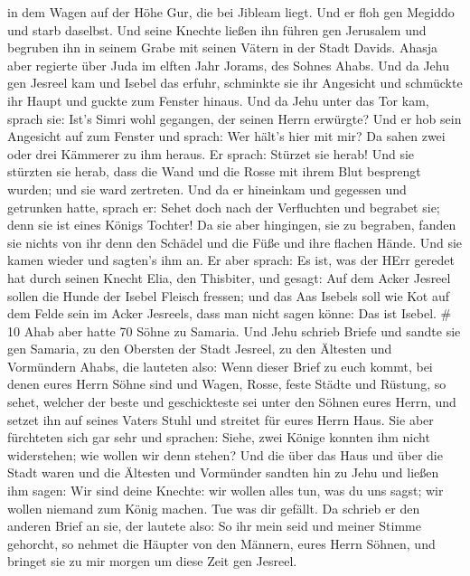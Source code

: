 in dem Wagen auf der Höhe Gur, die bei Jibleam liegt. Und er floh gen
Megiddo und starb daselbst.  Und seine Knechte ließen ihn
führen gen Jerusalem und begruben ihn in seinem Grabe mit seinen Vätern
in der Stadt Davids.  Ahasja aber regierte über Juda im
elften Jahr Jorams, des Sohnes Ahabs.  Und da Jehu gen
Jesreel kam und Isebel das erfuhr, schminkte sie ihr Angesicht und
schmückte ihr Haupt und guckte zum Fenster hinaus.  Und da
Jehu unter das Tor kam, sprach sie: Ist's Simri wohl gegangen, der
seinen Herrn erwürgte?  Und er hob sein Angesicht auf zum
Fenster und sprach: Wer hält's hier mit mir? Da sahen zwei oder drei
Kämmerer zu ihm heraus.  Er sprach: Stürzet sie herab! Und
sie stürzten sie herab, dass die Wand und die Rosse mit ihrem Blut
besprengt wurden; und sie ward zertreten.  Und da er
hineinkam und gegessen und getrunken hatte, sprach er: Sehet doch nach
der Verfluchten und begrabet sie; denn sie ist eines Königs Tochter!
 Da sie aber hingingen, sie zu begraben, fanden sie nichts
von ihr denn den Schädel und die Füße und ihre flachen Hände.
 Und sie kamen wieder und sagten's ihm an. Er aber sprach:
Es ist, was der HErr geredet hat durch seinen Knecht Elia, den
Thisbiter, und gesagt: Auf dem Acker Jesreel sollen die Hunde der Isebel
Fleisch fressen;  und das Aas Isebels soll wie Kot auf dem
Felde sein im Acker Jesreels, dass man nicht sagen könne: Das ist
Isebel. \# 10  Ahab aber hatte 70 Söhne zu Samaria. Und Jehu
schrieb Briefe und sandte sie gen Samaria, zu den Obersten der Stadt
Jesreel, zu den Ältesten und Vormündern Ahabs, die lauteten also:
 Wenn dieser Brief zu euch kommt, bei denen eures Herrn
Söhne sind und Wagen, Rosse, feste Städte und Rüstung,  so
sehet, welcher der beste und geschickteste sei unter den Söhnen eures
Herrn, und setzet ihn auf seines Vaters Stuhl und streitet für eures
Herrn Haus.  Sie aber fürchteten sich gar sehr und sprachen:
Siehe, zwei Könige konnten ihm nicht widerstehen; wie wollen wir denn
stehen?  Und die über das Haus und über die Stadt waren und
die Ältesten und Vormünder sandten hin zu Jehu und ließen ihm sagen: Wir
sind deine Knechte: wir wollen alles tun, was du uns sagst; wir wollen
niemand zum König machen. Tue was dir gefällt.  Da schrieb
er den anderen Brief an sie, der lautete also: So ihr mein seid und
meiner Stimme gehorcht, so nehmet die Häupter von den Männern, eures
Herrn Söhnen, und bringet sie zu mir morgen um diese Zeit gen Jesreel.

